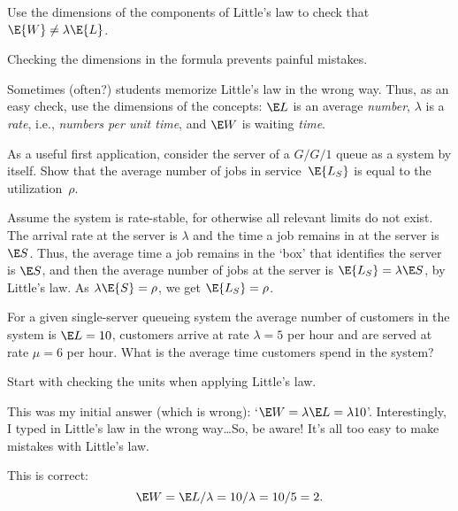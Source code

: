 \begin{exercise}
  Use the dimensions of the components of Little's law to check that $\E{W} \neq \lambda \E{L}$.
  \begin{hint}
Checking the dimensions in the formula  prevents painful mistakes.
  \end{hint}
  \begin{solution}
  Sometimes (often?) students memorize Little's law in the wrong
  way. Thus, as an easy check, use the dimensions of the concepts:
  $\E L$ is an average \emph{number}, $\lambda$ is a \emph{rate},
  i.e., \emph{numbers per unit time}, and $\E W$ is waiting
  \emph{time}. 
  \end{solution}
\end{exercise}



\begin{exercise}
As a useful first application, consider the server of a $G/G/1$ queue
as a system by itself. Show that the average number of jobs in service~$\E{L_S}$ is equal to the utilization~$\rho$. 
\begin{solution}
 Assume the system is rate-stable, for otherwise
all relevant limits do not exist.  The arrival rate at the server is
$\lambda$ and the time a job remains in at the server is $\E S$. Thus, the average time a job remains in the `box' that identifies the server is $\E S$, and then the average number of jobs at the server is $\E{L_S} = \lambda \E S$, by Little's law. As $\lambda \E{S} = \rho$, we get
$\E{L_S} = \rho$.
\end{solution}
\end{exercise}


\begin{exercise}
  For a given single-server queueing system the average number of
  customers in the system is $\E L = 10$, customers arrive at rate
  $\lambda=5$ per hour and are served at rate $\mu=6$ per hour.
 What is the average time customers spend in the system?
  \begin{hint}
Start with checking the units when applying Little's law.
  \end{hint}
    \begin{solution}
 This was my initial answer (which is wrong):
        `$\E W = \lambda \E L = \lambda 10$'.  Interestingly, I typed
        in Little's law in the wrong way\ldots So, be aware! It's all
        too easy to make mistakes with Little's law.

    This is correct: 
    \begin{equation*}
      \E W = \E L/\lambda = 10/\lambda = 10/5 = 2.
    \end{equation*}
    \end{solution}
\end{exercise}

